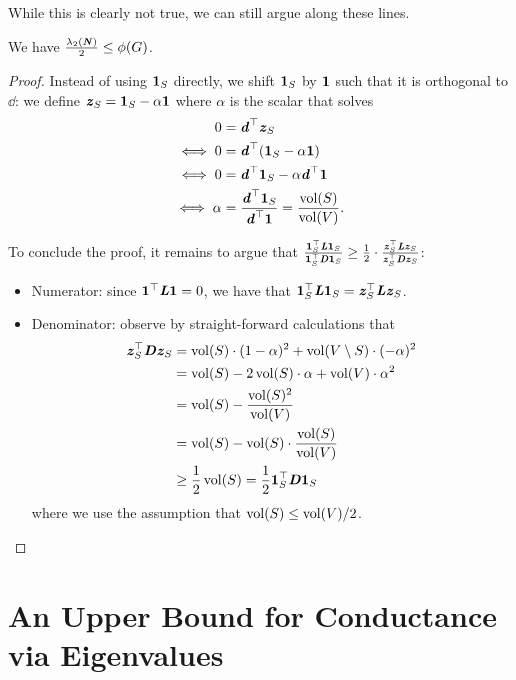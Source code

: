 While this is clearly not true, we can still argue along these lines.

\begin{theorem}\label{thm:cheegerInequLowerBound}
We have $\frac{\lambda_2(\NN)}{2} \leq \phi(G)$.
\end{theorem}
\begin{proof}
Instead of using $\vecone_S$ directly, we shift $\vecone_S$ by $\vecone$ such that it is orthogonal to $\dd$: we define $\zz_S = \vecone_S - \alpha \vecone$ where $\alpha$ is the scalar that solves
\begin{align*}
       0 &= \dd^\trp \zz_S \\
       \iff 0 &= \dd^\trp(\vecone_S - \alpha \vecone)\\
       \iff 0 &= \dd^\trp \vecone_S - \alpha  \dd^\trp\vecone \\
       \iff \alpha &= \frac{\dd^\trp \vecone_S}{\dd^\trp\vecone} = \frac{\vol(S)}{\vol(V)}.
\end{align*}

To conclude the proof, it remains to argue that $\frac{\vecone_S^\trp \LL \vecone_S}{\vecone_S^\trp\DD\vecone_S} \geq \frac{1}{2} \cdot \frac{\zz_S^\trp \LL \zz_S}{\zz_S^\trp\DD\zz_S}$:
\begin{itemize}
    \item Numerator: since $\vecone^\trp \LL \vecone = 0$, we have that $\vecone_S^\trp \LL \vecone_S = \zz_S^\trp \LL \zz_S$.
    \item Denominator: observe by straight-forward calculations that \begin{align*}
        \zz_S^\trp\DD\zz_S &= \vol(S) \cdot (1-\alpha)^2 + \vol(V \setminus S) \cdot (-\alpha)^2\\
        &= \vol(S) - 2\vol(S) \cdot \alpha + \vol(V) \cdot \alpha^2\\
        & = \vol(S) -   \frac{\vol(S)^2}{\vol(V)} \\
        & = \vol(S) - \vol(S) \cdot  \frac{\vol(S)}{\vol(V)}\\
        & \geq \frac{1}{2}\vol(S) = \frac{1}{2}\vecone_S^\trp\DD\vecone_S
    \end{align*}
    where we use the assumption that $\vol(S) \leq \vol(V)/2$.
\end{itemize}
\end{proof}

\section{An Upper Bound for Conductance via Eigenvalues}

